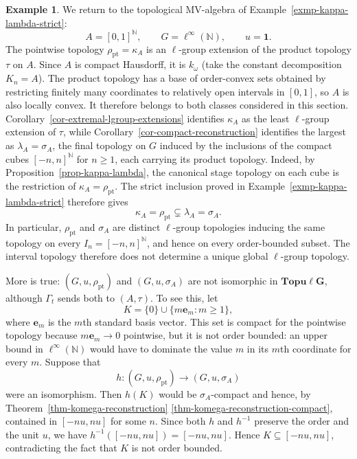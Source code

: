 \documentclass[preprint,3p]{elsarticle}
\theoremstyle{plain}
\theoremstyle{definition}
\newtheorem{exmp}[thm]{Example}
\newcommand{\Topulg}{\mathbf{Topu\ell G}}
\numberwithin{equation}{section}
\begin{document}
\begin{exmp}
\label{exmp-product-cubes}
We return to the topological MV-algebra of
Example~\ref{exmp-kappa-lambda-strict}:
\[
 A=[0,1]^{\mathbb N},\qquad
 G=\ell^\infty(\mathbb N),\qquad u=\mathbf1.
\]
The pointwise topology $\rho_{\mathrm{pt}}=\kappa_A$ is an
$\ell$-group extension of the product topology $\tau$ on $A$.
Since $A$ is compact Hausdorff, it is $k_\omega$ (take the constant
decomposition $K_n=A$).  The product topology has a base of
order-convex sets obtained by restricting finitely many coordinates
to relatively open intervals in $[0,1]$, so $A$ is also locally
convex.  It therefore belongs to both classes considered in this section.
Corollary~\ref{cor-extremal-lgroup-extensions} identifies $\kappa_A$ as
the least $\ell$-group extension of $\tau$, while
Corollary~\ref{cor-compact-reconstruction} identifies the largest as
$\lambda_A=\sigma_A$, the final topology on $G$ induced by the
inclusions of the compact cubes $[-n,n]^{\mathbb N}$ for $n\geq1$,
each carrying its product topology.  Indeed, by
Proposition~\ref{prop-kappa-lambda}, the canonical stage topology
on each cube is the restriction of $\kappa_A=\rho_{\mathrm{pt}}$.
The strict inclusion proved in Example~\ref{exmp-kappa-lambda-strict}
therefore gives
\[
 \kappa_A=\rho_{\mathrm{pt}}\subsetneq\lambda_A=\sigma_A.
\]
In particular, $\rho_{\mathrm{pt}}$ and $\sigma_A$ are distinct
$\ell$-group topologies inducing the same topology on every
$I_n=[-n,n]^{\mathbb N}$, and hence on every order-bounded subset.
The interval topology therefore does not determine a unique
global $\ell$-group topology.

More is true: $(G,u,\rho_{\mathrm{pt}})$ and $(G,u,\sigma_A)$ are not
isomorphic in $\Topulg$, although $\Gamma_t$ sends both to $(A,\tau)$.
To see this, let
\[
 K=\{0\}\cup\{m\mathbf e_m:m\geq1\},
\]
where $\mathbf e_m$ is the $m$th standard basis vector.
This set is compact for the pointwise topology because
$m\mathbf e_m\to0$ pointwise, but it is not order bounded: an upper
bound in $\ell^\infty(\mathbb N)$ would have to dominate the value
$m$ in its $m$th coordinate for every $m$.  Suppose that
\[
 h\colon(G,u,\rho_{\mathrm{pt}})\longrightarrow(G,u,\sigma_A)
\]
were an isomorphism.  Then $h(K)$ would be $\sigma_A$-compact and hence,
by Theorem~\ref{thm-komega-reconstruction}%
\ref{thm-komega-reconstruction-compact}, contained in $[-nu,nu]$ for some
$n$.  Since both $h$ and $h^{-1}$ preserve the order and the
unit $u$, we have $h^{-1}([-nu,nu])=[-nu,nu]$.
Hence $K\subseteq[-nu,nu]$, contradicting the fact
that $K$ is not order bounded.


\end{exmp}
\end{document}
